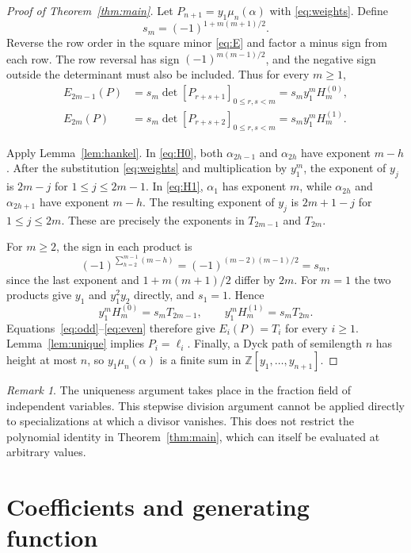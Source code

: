 \documentclass[11pt]{article}
\theoremstyle{remark}
\newtheorem{remark}[theorem]{Remark}
\newcommand{\Z}{\mathbb Z}
\newcommand{\LH}{\ell}
\begin{document}
\begin{proof}[Proof of Theorem~\ref{thm:main}]
Let $P_{n+1}=y_1\mu_n(\alpha)$ with \eqref{eq:weights}. Define
\[
 s_m=(-1)^{1+m(m+1)/2}.
\]
Reverse the row order in the square minor \eqref{eq:E} and factor a
minus sign from each row. The row reversal has sign
$(-1)^{m(m-1)/2}$, and the negative sign outside the determinant must
also be included. Thus for every $m\ge1$,
\begin{align}
 E_{2m-1}(P)&=s_m\det[P_{r+s+1}]_{0\le r,s<m}
             =s_my_1^m H_m^{(0)},\label{eq:odd}\\
 E_{2m}(P)&=s_m\det[P_{r+s+2}]_{0\le r,s<m}
             =s_my_1^m H_m^{(1)}.\label{eq:even}
\end{align}

Apply Lemma~\ref{lem:hankel}. In \eqref{eq:H0}, both
$\alpha_{2h-1}$ and $\alpha_{2h}$ have exponent $m-h$. After the
substitution \eqref{eq:weights} and multiplication by $y_1^m$, the
exponent of $y_j$ is $2m-j$ for $1\le j\le2m-1$. In \eqref{eq:H1},
$\alpha_1$ has exponent $m$, while $\alpha_{2h}$ and
$\alpha_{2h+1}$ have exponent $m-h$. The resulting exponent of $y_j$
is $2m+1-j$ for $1\le j\le2m$. These are precisely the exponents
in $T_{2m-1}$ and $T_{2m}$.

For $m\ge2$, the sign in each product is
\[
 (-1)^{\sum_{h=2}^{m-1}(m-h)}
   =(-1)^{(m-2)(m-1)/2}=s_m,
\]
since the last exponent and $1+m(m+1)/2$ differ by $2m$.
For $m=1$ the two products give $y_1$ and $y_1^2y_2$ directly, and
$s_1=1$. Hence
\[
 y_1^mH_m^{(0)}=s_mT_{2m-1},\qquad
 y_1^mH_m^{(1)}=s_mT_{2m}.
\]
Equations~\eqref{eq:odd}--\eqref{eq:even} therefore give
$E_i(P)=T_i$ for every $i\ge1$. Lemma~\ref{lem:unique} implies
$P_i=\LH_i$. Finally, a Dyck path of semilength $n$ has height at
most $n$, so $y_1\mu_n(\alpha)$ is a finite sum in
$\Z[y_1,\ldots,y_{n+1}]$.
\end{proof}

\begin{remark}
The uniqueness argument takes place in the fraction field of independent
variables. This stepwise division argument cannot be applied directly
to specializations at which a divisor vanishes.
This does not restrict the polynomial identity in Theorem~\ref{thm:main},
which can itself be evaluated at arbitrary values.
\end{remark}

\section{Coefficients and generating function}
\end{document}
